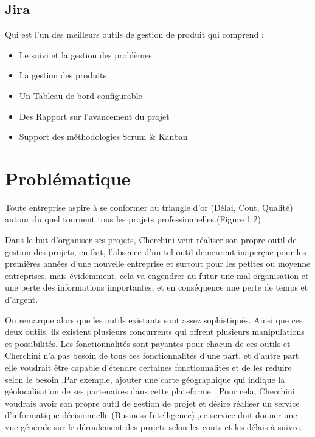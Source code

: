 \subsection{Jira}
Qui est l'un des meilleurs outils de gestion de produit qui comprend :
\begin{itemize}

\item{Le suivi et la gestion des probl\`{e}mes}

\item{La gestion des produits}

\item{Un Tableau de bord configurable}

\item{Des Rapport sur l'avancement du projet}

\item{Support des m\'{e}thodologies Scrum \& Kanban}

\end{itemize}



\section{ Probl\'{e}matique }
Toute entreprise aspire \`{a} se conformer au triangle d'or (D\'{e}lai, Cout, Qualit\'{e})
autour du quel tournent tous les projets professionnelles.(Figure 1.2)




Dans le but d'organiser ses projets, Cherchini veut r\'{e}aliser son propre outil de
gestion des projets, en fait, l'absence d'un tel outil demeurent inaper\c{c}ue
pour les premi\`{e}res ann\'{e}es d'une nouvelle entreprise et surtout pour les
petites ou moyenne entreprises, mais \'{e}videmment, cela va engendrer au futur
une mal organisation et une perte des informations importantes, et en
cons\'{e}quence une perte de temps et d'argent.

On remarque alors que les outils existants sont assez sophistiqu\'{e}s.
Ainsi que ces deux outils, ils existent plusieurs concurrents qui offrent
plusieurs manipulations et possibilit\'{e}s.
Les fonctionnalit\'{e}s sont payantes pour chacun de ces outils et Cherchini n'a
pas besoin de tous ces fonctionnalit\'{e}s d'une part, et d'autre part elle voudrait
\^{e}tre capable d'\'{e}tendre certaines fonctionnalit\'{e}s et de les r\'{e}duire selon le
besoin .Par exemple, ajouter une carte g\'{e}ographique qui indique la
g\'{e}olocalisation de ses partenaires dans cette plateforme .
Pour cela, Cherchini voudrais avoir son propre outil de gestion de projet et d\'{e}sire r\'{e}aliser un
service d'informatique d\'{e}cisionnelle (Business Intelligence) ,ce service doit donner une vue g\'{e}n\'{e}rale sur le d\'{e}roulement des projets
selon les couts et les d\'{e}lais \`{a} suivre.


